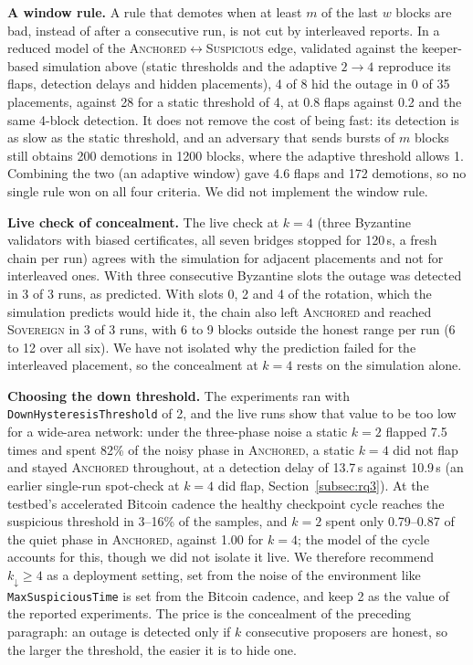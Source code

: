 \textbf{A window rule.} A rule that demotes when at least $m$ of the last $w$ blocks are bad,
instead of after a consecutive run, is not cut by interleaved reports. In a
reduced model of the \textsc{Anchored}$\leftrightarrow$\textsc{Suspicious} edge,
validated against the keeper-based simulation above (static thresholds and the
adaptive $2\to4$ reproduce its flaps, detection delays and hidden placements),
4 of 8 hid the outage in 0 of 35 placements, against 28 for a static threshold
of 4, at 0.8 flaps against 0.2 and the same 4-block detection. It does not
remove the cost of being fast: its detection is as slow as the static
threshold, and an adversary that sends bursts of $m$ blocks still obtains 200
demotions in 1200 blocks, where the adaptive threshold allows 1. Combining the
two (an adaptive window) gave 4.6 flaps and 172 demotions, so no single rule
won on all four criteria. We did not implement the window rule.

\textbf{Live check of concealment.} The live check at $k{=}4$ (three Byzantine validators with biased certificates, all seven bridges stopped for 120\,s, a fresh chain per run)
agrees with the simulation for adjacent placements and not for interleaved ones. With three consecutive Byzantine slots
the outage was detected in 3 of 3 runs, as predicted. With slots 0, 2 and 4 of the rotation, which the simulation predicts
would hide it, the chain also left \textsc{Anchored} and reached \textsc{Sovereign} in 3 of 3 runs, with 6 to 9 blocks outside the honest range
per run (6 to 12 over all six). We have not isolated why the prediction failed for the interleaved placement, so the concealment at $k{=}4$ rests on the simulation alone.

\textbf{Choosing the down threshold.} The experiments ran with
\texttt{DownHysteresisThreshold} of 2, and the live runs show that value to be too
low for a wide-area network: under the three-phase noise a static $k{=}2$ flapped
7.5 times and spent 82\% of the noisy phase in \textsc{Anchored}, a static $k{=}4$
did not flap and stayed \textsc{Anchored} throughout, at a detection delay of 13.7\,s
against 10.9\,s (an earlier single-run spot-check at $k{=}4$ did flap,
Section~\ref{subsec:rq3}). At the testbed's accelerated Bitcoin cadence the healthy checkpoint
cycle reaches the suspicious threshold in 3--16\% of the samples, and $k{=}2$ spent only
0.79--0.87 of the quiet phase in \textsc{Anchored}, against 1.00 for $k{=}4$; the
model of the cycle accounts for this, though we did not isolate it live.
We therefore recommend $k_{\downarrow} \geq 4$ as a deployment setting, set from the
noise of the environment like \texttt{MaxSuspiciousTime} is set from the Bitcoin
cadence, and keep 2 as the value of the reported experiments. The price is the
concealment of the preceding paragraph: an outage is detected only if $k$
consecutive proposers are honest, so the larger the threshold, the easier it is to
hide one.


